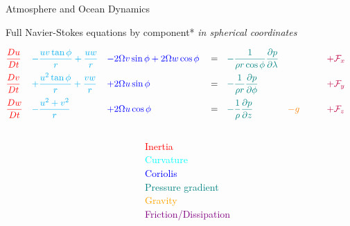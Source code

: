 \documentclass[aspectratio=169,xcolor=dvipsnames]{beamer}
\begin{document}
\begin{frame}{}

\centering

{\huge 
Atmosphere and Ocean Dynamics
}

\end{frame}

\begin{frame}{Full Navier-Stokes equations by component*}
\vspace{0em}
\hspace{10cm}
{\small *\emph{in spherical coordinates}}

\begin{align*}
    &\textcolor{red}{    \frac{Du}{Dt}   }&
    &\textcolor{cyan}{   - \frac{uv \tan\phi}{r} + \frac{uw}{r}  }& 
    & \textcolor{blue}{   - 2\Omega v \sin\phi + 2\Omega w \cos\phi   }&
    & = &
    &\textcolor{teal}{   -\frac{1}{\rho r \cos\phi}\frac{\partial p}{\partial \lambda}  }&
    &&
    & \textcolor{purple}{\quad + \mathcal{F}_x }&
    \\
    &\textcolor{red}{    \frac{Dv}{Dt}   } &
    &\textcolor{cyan}{   + \frac{u^2 \tan\phi}{r} + \frac{vw}{r}     }&
    & \textcolor{blue}{   + 2\Omega u \sin\phi    }&
    & = &
    &\textcolor{teal}{   -\frac{1}{\rho r}\frac{\partial p}{\partial \phi}  }&
    &&
    & \textcolor{purple}{\quad + \mathcal{F}_y }&
    \\
    &\textcolor{red}{    \frac{Dw}{Dt}   } &
    &\textcolor{cyan}{   - \frac{u^2 + v^2}{r}   }&
    & \textcolor{blue}{   + 2\Omega u \cos\phi    }&
    & = &
    &\textcolor{teal}{   -\frac{1}{\rho}\frac{\partial p}{\partial z} }&
    & \textcolor{orange}{- g \quad}&
    & \textcolor{purple}{\quad + \mathcal{F}_z }&
\end{align*}

\begin{columns}
    \begin{column}{0.6\textwidth}
    \end{column}
    \begin{column}{0.4\textwidth}
        \begin{flushright}
            \vspace{-2em}
            {\footnotesize 
            \textcolor{red}{Inertia} \\
            \textcolor{cyan}{Curvature} \\
            \textcolor{blue}{Coriolis} \\
            \textcolor{teal}{Pressure gradient} \\
            \textcolor{orange}{Gravity} \\
            \textcolor{purple}{Friction/Dissipation}
            }
        \end{flushright}
    \end{column}
\end{columns}
        
\end{frame}
\end{document}

